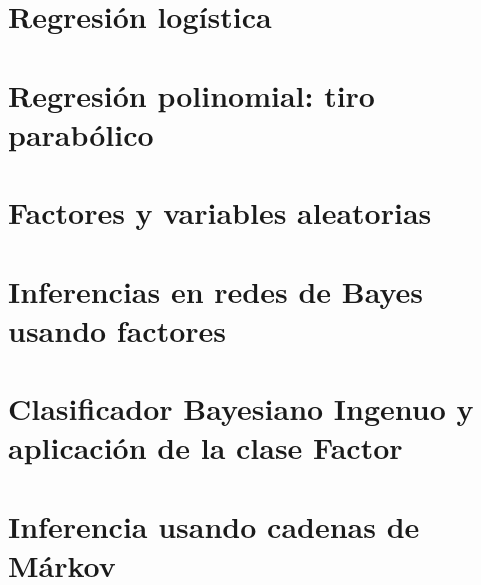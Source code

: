 \documentclass[12pt,openany]{book}
\begin{document}





\chapter{Regresión logística}





\chapter{Regresión polinomial: tiro parabólico}






\chapter{Factores y variables aleatorias}





\chapter[Inferencia]{Inferencias en redes de Bayes usando factores}





\chapter[Bayes Ingenuo]{Clasificador Bayesiano Ingenuo y aplicación de la clase Factor}





\chapter{Inferencia usando cadenas de Márkov}
\end{document}
